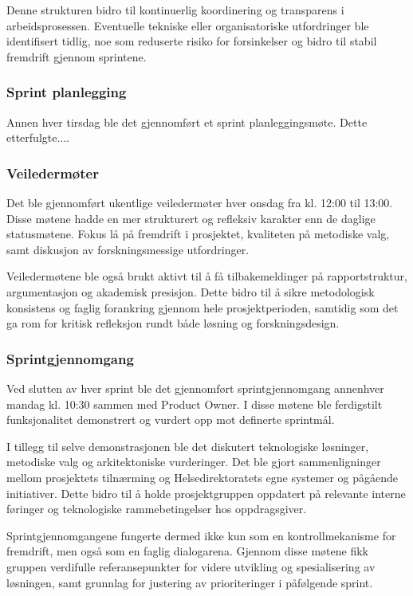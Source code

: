 Denne strukturen bidro til kontinuerlig koordinering og transparens i arbeidsprosessen. Eventuelle tekniske eller organisatoriske utfordringer ble identifisert tidlig, noe som reduserte risiko for forsinkelser og bidro til stabil fremdrift gjennom sprintene.

\subsubsection*{Sprint planlegging}
Annen hver tirsdag ble det gjennomført et sprint planleggingsmøte. Dette etterfulgte....

\subsubsection*{Veiledermøter}

Det ble gjennomført ukentlige veiledermøter hver onsdag fra kl. 12:00 til 13:00. Disse møtene hadde en mer strukturert og refleksiv karakter enn de daglige statusmøtene. Fokus lå på fremdrift i prosjektet, kvaliteten på metodiske valg, samt diskusjon av forskningsmessige utfordringer.

Veiledermøtene ble også brukt aktivt til å få tilbakemeldinger på rapportstruktur, argumentasjon og akademisk presisjon. Dette bidro til å sikre metodologisk konsistens og faglig forankring gjennom hele prosjektperioden, samtidig som det ga rom for kritisk refleksjon rundt både løsning og forskningsdesign.

\subsubsection*{Sprintgjennomgang}

Ved slutten av hver sprint ble det gjennomført sprintgjennomgang annenhver mandag kl. 10:30 sammen med Product Owner. I disse møtene ble ferdigstilt funksjonalitet demonstrert og vurdert opp mot definerte sprintmål.

I tillegg til selve demonstrasjonen ble det diskutert teknologiske løsninger, metodiske valg og arkitektoniske vurderinger. Det ble gjort sammenligninger mellom prosjektets tilnærming og Helsedirektoratets egne systemer og pågående initiativer. Dette bidro til å holde prosjektgruppen oppdatert på relevante interne føringer og teknologiske rammebetingelser hos oppdragsgiver.

Sprintgjennomgangene fungerte dermed ikke kun som en kontrollmekanisme for fremdrift, men også som en faglig dialogarena. Gjennom disse møtene fikk gruppen verdifulle referansepunkter for videre utvikling og spesialisering av løsningen, samt grunnlag for justering av prioriteringer i påfølgende sprint.

